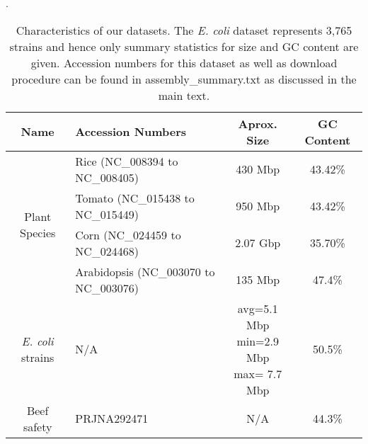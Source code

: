 

    \begin{table}
       \caption{Characteristics of our datasets.  The \emph{E. coli} dataset represents 3,765 strains and hence only summary statistics for size and GC content are given. Accession numbers for this dataset as well as download procedure can be found in assembly\_summary.txt as discussed in the main text.}.
  \label{tbl-datasets}
      \small
   \centering
   \begin{tabular}{clcc}
     \toprule
     {\bf Name} &  {\bf Accession Numbers} & {\bf Aprox. Size} & {\bf GC Content} \\

     \midrule
     
     \multirow{4}{*}{Plant Species }
     & Rice  (NC\_008394 to NC\_008405) & 430 Mbp & 43.42\% \\
     & Tomato  (NC\_015438 to NC\_015449) &  950 Mbp & 43.42\% \\
     & Corn  (NC\_024459 to NC\_024468) & 2.07 Gbp & 35.70\% \\
     & Arabidopsis  (NC\_003070 to NC\_003076) & 135 Mbp & 47.4\% \\
     \midrule

     \emph{E. coli} strains &  N/A & \pbox{3cm}{avg=5.1 Mbp\\ min=2.9 Mbp\\ max= 7.7 Mbp} & 50.5\% \\

     \midrule

     Beef safety &  PRJNA292471 & N/A & 44.3\% \\
     \bottomrule
   \end{tabular}
   \end{table}



